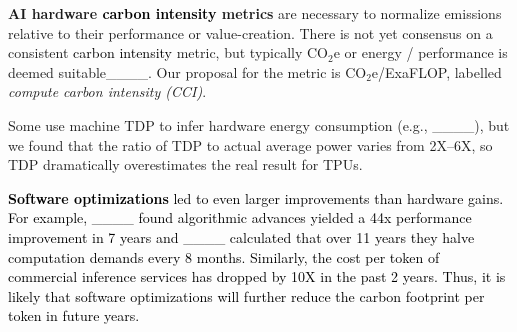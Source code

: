 \textbf{AI hardware \textcolor{black}{carbon intensity} metrics} are necessary to normalize emissions relative to their performance or value-creation. There is not yet consensus on a consistent \textcolor{black}{carbon intensity} metric, but typically CO$_{2}$e or energy / performance is deemed suitable____. Our proposal for the metric is CO$_{2}$e/ExaFLOP, labelled \textit{compute carbon intensity (CCI)}.

Some use machine TDP to infer hardware energy consumption (e.g., ____), but we found that the ratio of TDP to actual average power varies from 2X--6X, so TDP dramatically overestimates the real result for TPUs.

\textcolor{black}{\textbf{Software optimizations} led to even larger improvements than hardware gains. For example, ____ found algorithmic advances yielded a 44x performance improvement in 7 years and ____ calculated that over 11 years they halve computation demands every 8 months. Similarly, the cost per token of commercial inference services has dropped by 10X in the past 2 years. Thus, it is likely that software optimizations will further reduce the carbon footprint per token in future years.}